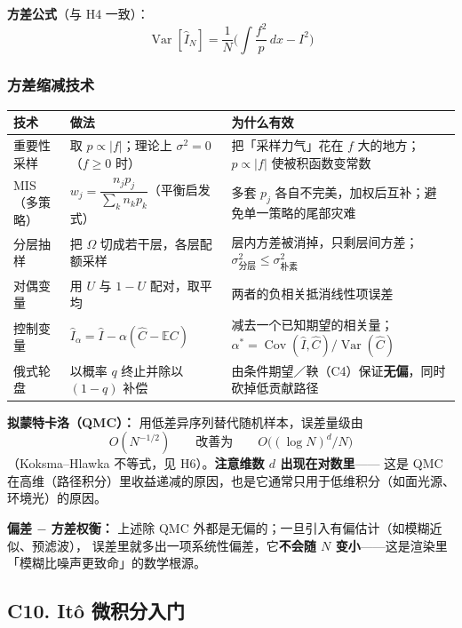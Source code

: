 \textbf{方差公式}（与 H4 一致）：
\[
\operatorname{Var}[\hat I_N]=\frac1N\Big(\int\frac{f^2}{p}\,dx-I^2\Big)
\]

\subsubsection{方差缩减技术}

\begin{center}
\begin{tabular}{L{3.0cm}L{6.0cm}L{5.2cm}}
\toprule
\textbf{技术} & \textbf{做法} & \textbf{为什么有效} \\
\midrule
重要性采样 & 取 $p\propto|f|$；理论上 $\sigma^2=0$（$f\ge0$ 时） &
把「采样力气」花在 $f$ 大的地方；$p\propto|f|$ 使被积函数变常数 \\
\addlinespace
MIS（多策略） & $w_j=\dfrac{n_jp_j}{\sum_kn_kp_k}$（平衡启发式） &
多套 $p_j$ 各自不完美，加权后互补；避免单一策略的尾部灾难 \\
\addlinespace
分层抽样 & 把 $\Omega$ 切成若干层，各层配额采样 &
层内方差被消掉，只剩层间方差；$\sigma^2_{\text{分层}}\le\sigma^2_{\text{朴素}}$ \\
\addlinespace
对偶变量 & 用 $U$ 与 $1-U$ 配对，取平均 &
两者的负相关抵消线性项误差 \\
\addlinespace
控制变量 & $\hat I_\alpha=\hat I-\alpha(\hat C-\mathbb E C)$ &
减去一个已知期望的相关量；$\alpha^*=\operatorname{Cov}(\hat I,\hat C)/\operatorname{Var}(\hat C)$ \\
\addlinespace
俄式轮盘 & 以概率 $q$ 终止并除以 $(1-q)$ 补偿 &
由条件期望／鞅（C4）保证\textbf{无偏}，同时砍掉低贡献路径 \\
\bottomrule
\end{tabular}
\end{center}

\textbf{拟蒙特卡洛（QMC）：} 用低差异序列替代随机样本，误差量级由
\[
O(N^{-1/2})\qquad\text{改善为}\qquad O\big((\log N)^d/N\big)
\]
（Koksma--Hlawka 不等式，见 H6）。\textbf{注意维数 $d$ 出现在对数里}——
这是 QMC 在高维（路径积分）里收益递减的原因，也是它通常只用于低维积分（如面光源、环境光）的原因。

\textbf{偏差 $-$ 方差权衡：} 上述除 QMC 外都是无偏的；一旦引入有偏估计（如模糊近似、预滤波），
误差里就多出一项系统性偏差，它\textbf{不会随 $N$ 变小}——这是渲染里「模糊比噪声更致命」的数学根源。

\subsection{C10. Itô 微积分入门}

